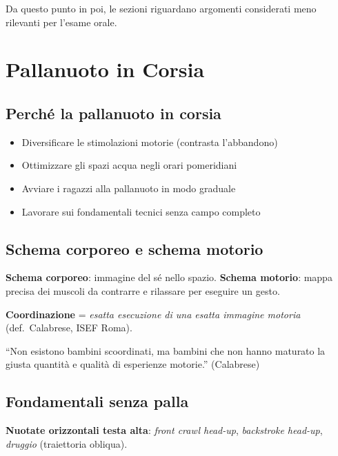 \documentclass[12pt, a4paper]{article}
\begin{document}
\begin{notebox}[Nota]
Da questo punto in poi, le sezioni riguardano argomenti considerati meno rilevanti per l'esame orale.
\end{notebox}

\section{Pallanuoto in Corsia}

\subsection{Perché la pallanuoto in corsia}

\begin{itemize}
  \item Diversificare le stimolazioni motorie (contrasta l'abbandono)
  \item Ottimizzare gli spazi acqua negli orari pomeridiani
  \item Avviare i ragazzi alla pallanuoto in modo graduale
  \item Lavorare sui fondamentali tecnici senza campo completo
\end{itemize}

\subsection{Schema corporeo e schema motorio}

\textbf{Schema corporeo}: immagine del sé nello spazio. \textbf{Schema motorio}: mappa precisa dei muscoli da contrarre e rilassare per eseguire un gesto.

\textbf{Coordinazione} = \textit{esatta esecuzione di una esatta immagine motoria} (def.\ Calabrese, ISEF Roma).

\begin{quotebox}
``Non esistono bambini scoordinati, ma bambini che non hanno maturato la giusta quantità e qualità di esperienze motorie.'' (Calabrese)
\end{quotebox}

\subsection{Fondamentali senza palla}

\textbf{Nuotate orizzontali testa alta}: \textit{front crawl head-up}, \textit{backstroke head-up}, \textit{druggio} (traiettoria obliqua).
\end{document}
